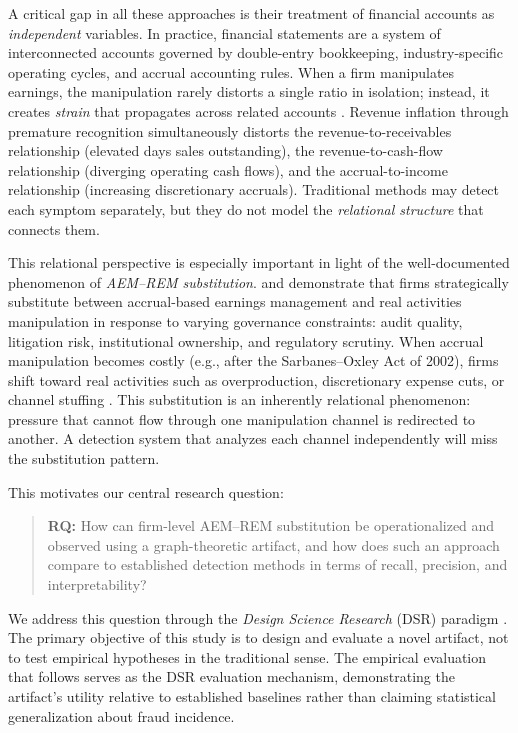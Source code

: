 \documentclass[12pt]{article}
\begin{document}
A critical gap in all these approaches is their treatment of financial accounts
as \emph{independent} variables.  In practice, financial statements are a
system of interconnected accounts governed by double-entry bookkeeping,
industry-specific operating cycles, and accrual accounting rules.  When a firm
manipulates earnings, the manipulation rarely distorts a single ratio in
isolation; instead, it creates \emph{strain} that propagates across related
accounts \citep{dechow1995}.  Revenue inflation through premature recognition
simultaneously distorts the revenue-to-receivables relationship (elevated days
sales outstanding), the revenue-to-cash-flow relationship (diverging operating
cash flows), and the accrual-to-income relationship (increasing discretionary
accruals).  Traditional methods may detect each symptom separately, but they
do not model the \emph{relational structure} that connects them.

This relational perspective is especially important in light of the
well-documented phenomenon of \emph{AEM--REM substitution}.
\citet{cohen2008} and \citet{zang2012} demonstrate that firms strategically
substitute between accrual-based earnings management and real activities
manipulation in response to varying governance constraints: audit quality,
litigation risk, institutional ownership, and regulatory scrutiny.  When
accrual manipulation becomes costly (e.g., after the Sarbanes--Oxley Act of
2002), firms shift toward real activities such as overproduction, discretionary
expense cuts, or channel stuffing \citep{roychowdhury2006}.  This substitution
is an inherently relational phenomenon: pressure that cannot flow through one
manipulation channel is redirected to another.  A detection system that
analyzes each channel independently will miss the substitution pattern.

This motivates our central research question:

\begin{quote}
\textbf{RQ:} How can firm-level AEM--REM substitution be
operationalized and observed using a graph-theoretic artifact, and how
does such an approach compare to established detection methods in
terms of recall, precision, and interpretability?
\end{quote}

We address this question through the \emph{Design Science Research} (DSR)
paradigm \citep{hevner2004,peffers2007}.  The primary objective of this study
is to design and evaluate a novel artifact, not to test empirical hypotheses
in the traditional sense.  The empirical evaluation that follows serves as
the DSR evaluation mechanism, demonstrating the artifact's utility relative
to established baselines rather than claiming statistical generalization
about fraud incidence.
\end{document}
